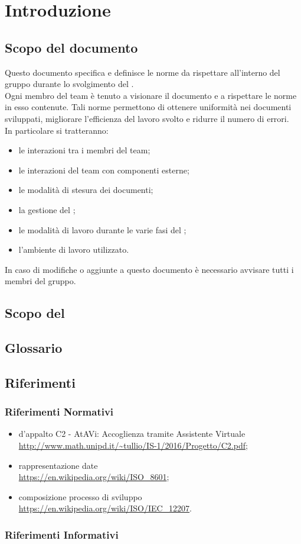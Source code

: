 \section{Introduzione}
	\subsection{Scopo del documento}
	Questo documento specifica e definisce le norme da rispettare all'interno del gruppo \GRUPPO{} durante lo svolgimento del  \PROGETTO. \\
	Ogni membro del team è tenuto a visionare il documento e a rispettare le norme in esso contenute. Tali norme permettono di ottenere uniformità nei documenti sviluppati,
	migliorare l'efficienza del lavoro svolto e ridurre il numero di errori. \\
	In particolare si tratteranno:
	\begin{itemize}
		\item le interazioni tra i membri del team;
		\item le interazioni del team con componenti esterne;
		\item le modalità di stesura dei documenti;
		\item la gestione del ;
		\item le modalità di lavoro durante le varie fasi del ;
		\item l'ambiente di lavoro utilizzato.
	\end{itemize}
	In caso di modifiche o aggiunte a questo documento è necessario avvisare tutti i membri del gruppo.
	\subsection{Scopo del }
		\SCOPO
	\subsection{Glossario}
		\GLOSSARIO
	\subsection{Riferimenti}
		\subsubsection{Riferimenti Normativi}
		\begin{itemize}
		\item {} d'appalto C2 - AtAVi: Accoglienza tramite Assistente Virtuale \\
		\url{http://www.math.unipd.it/~tullio/IS-1/2016/Progetto/C2.pdf};
		\item rappresentazione date \\
		\url{https://en.wikipedia.org/wiki/ISO_8601};
		\item composizione processo di sviluppo \\
		\url{https://en.wikipedia.org/wiki/ISO/IEC_12207}.

	\end{itemize}
	    \subsubsection{Riferimenti Informativi}
